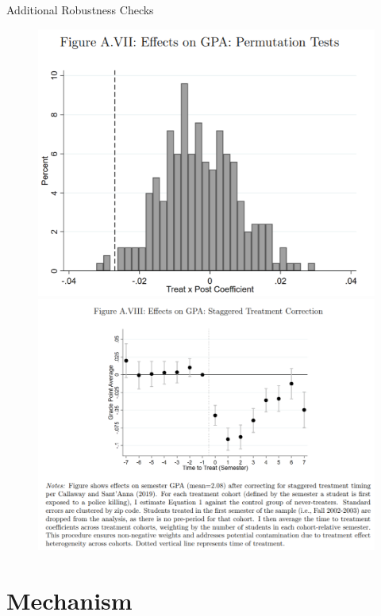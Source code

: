 \documentclass[dvipdfmx]{beamer}
\begin{document}
\begin{frame}{Additional Robustness Checks}
  \begin{figure}
    \centering
    \includegraphics[scale = .4]{fig_tab/os20220113/FA7.png}
    \includegraphics[scale = .4]{fig_tab/os20220113/FA8.png}
  \end{figure}
\end{frame}

\section{Mechanism}
\frame{\sectionpage}
\end{document}
